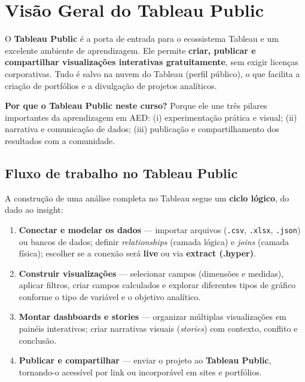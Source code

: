 \section{Visão Geral do Tableau Public}

O \textbf{Tableau Public} é a porta de entrada para o ecossistema Tableau e um excelente ambiente de aprendizagem.  
Ele permite \textbf{criar, publicar e compartilhar visualizações interativas gratuitamente}, sem exigir licenças corporativas.  
Tudo é salvo na nuvem do Tableau (perfil público), o que facilita a criação de portfólios e a divulgação de projetos analíticos.

\begin{NoteBox}
\textbf{Por que o Tableau Public neste curso?}  
Porque ele une três pilares importantes da aprendizagem em AED:  
(i) experimentação prática e visual;  
(ii) narrativa e comunicação de dados;  
(iii) publicação e compartilhamento dos resultados com a comunidade.
\end{NoteBox}

\subsection*{Fluxo de trabalho no Tableau Public}
A construção de uma análise completa no Tableau segue um \textbf{ciclo lógico}, do dado ao insight:

\begin{enumerate}[leftmargin=*]
  \item \textbf{Conectar e modelar os dados} — importar arquivos (\texttt{.csv}, \texttt{.xlsx}, \texttt{.json}) ou bancos de dados; definir \textit{relationships} (camada lógica) e \textit{joins} (camada física); escolher se a conexão será \textbf{live} ou via \textbf{extract (.hyper)}.
  
  \item \textbf{Construir visualizações} — selecionar campos (dimensões e medidas), aplicar filtros, criar campos calculados e explorar diferentes tipos de gráfico conforme o tipo de variável e o objetivo analítico.
  
  \item \textbf{Montar dashboards e stories} — organizar múltiplas visualizações em painéis interativos; criar narrativas visuais (\textit{stories}) com contexto, conflito e conclusão.
  
  \item \textbf{Publicar e compartilhar} — enviar o projeto ao \textbf{Tableau Public}, tornando-o acessível por link ou incorporável em sites e portfólios.
\end{enumerate}

